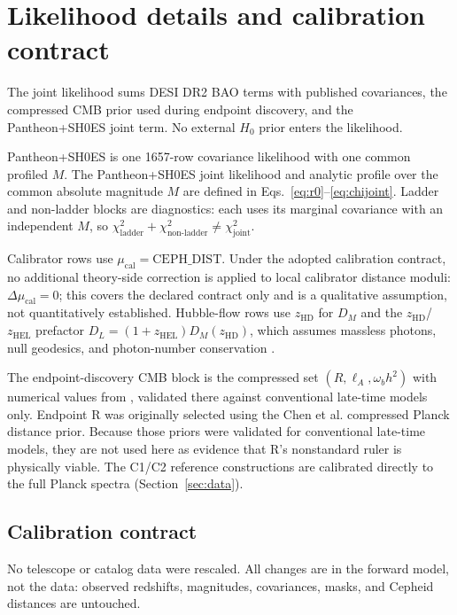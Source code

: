 \section{Likelihood details and calibration contract}
\label{app:likelihood}

The joint likelihood sums DESI DR2 BAO terms with published
covariances, the compressed CMB prior used during endpoint discovery,
and the Pantheon+SH0ES joint term. No external $H_{0}$ prior enters
the likelihood.

Pantheon+SH0ES is one 1657-row covariance likelihood with one common
profiled $M$. The Pantheon+SH0ES joint likelihood and analytic profile over the common absolute magnitude $M$ are defined in Eqs.~\eqref{eq:r0}--\eqref{eq:chijoint}.
Ladder and
non-ladder blocks are diagnostics: each uses its marginal covariance
with an independent $M$, so
$\chi^{2}_{\mathrm{ladder}}+\chi^{2}_{\mathrm{non\text{-}ladder}}
\neq \chi^{2}_{\mathrm{joint}}$.

Calibrator rows use $\mu_{\mathrm{cal}}=\mathrm{CEPH\_DIST}$.
Under the adopted calibration contract, no additional theory-side
correction is applied to local calibrator distance moduli:
$\Delta\mu_{\mathrm{cal}}=0$; this covers the declared contract only
and is a qualitative assumption, not quantitatively established.
Hubble-flow rows use $z_{\mathrm{HD}}$
for $D_{M}$ and the $z_{\mathrm{HD}}$/$z_{\mathrm{HEL}}$ prefactor
$D_{L}=(1+z_{\mathrm{HEL}})D_{M}(z_{\mathrm{HD}})$, which assumes massless
photons, null geodesics, and photon-number conservation
\citep{Etherington1933}.

The endpoint-discovery CMB block is the compressed set
$(R,\ell_{A},\omega_{b}h^{2})$ with numerical values from
\citep{Chen2019}, validated there against conventional late-time
models only. Endpoint R was originally selected using the Chen et al. compressed Planck distance prior. Because those priors were validated for conventional late-time models, they are not used here as evidence that R's nonstandard ruler is physically viable. The C1/C2 reference constructions are calibrated directly to the
full Planck spectra (Section~\ref{sec:data}).

\subsection{Calibration contract}
No telescope or catalog data were rescaled. All changes are in the
forward model, not the data: observed redshifts, magnitudes,
covariances, masks, and Cepheid distances are untouched.

